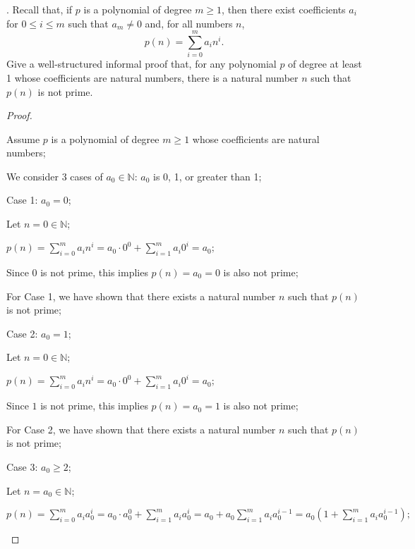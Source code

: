 \documentclass[11pt]{article}
\newcommand{\nats}{\mathbb{N}}
\begin{document}
.
Recall that, if $p$ is a polynomial of degree $m \geq 1$, then there exist coefficients $a_i$ for  $0 \leq i \leq m$ such that $a_m \neq 0$ and, for all numbers $n$,
$$p(n) =  \sum_{i=0}^m a_i n^i.$$
Give a well-structured informal proof that, for any polynomial $p$ of degree at least 1 whose coefficients are natural numbers,
there is a natural number $n$ such that $p(n)$ is not prime.




\begin{proof}
    \begin{adjustwidth}{1cm}{}
    \end{adjustwidth}

    \begin{adjustwidth}{0.5cm}{}
        Assume $p$ is a polynomial of degree $m\geq 1$ whose coefficients are natural numbers;

        We consider 3 cases of $a_0\in\nats$: $a_0$ is 0, 1, or greater than 1;

        Case 1: $a_0 = 0$;
        \begin{adjustwidth}{1.25cm}{}
            Let $n = 0\in\nats$;

            $\displaystyle p(n)=\sum_{i=0}^{m}a_i n^i=a_0\cdot 0^0+\sum_{i=1}^{m}a_i 0^i=a_0;$

            Since $0$ is not prime, this implies $p(n)=a_0=0$ is also not prime;
        \end{adjustwidth}
        For Case 1, we have shown that there exists a natural number $n$ such that $p(n)$ is not prime;

        Case 2: $a_0 = 1$;
        \begin{adjustwidth}{1.25cm}{}
            Let $n = 0\in\nats$;

            $\displaystyle p(n)=\sum_{i=0}^{m}a_i n^i=a_0\cdot 0^0+\sum_{i=1}^{m}a_i 0^i=a_0;$

            Since $1$ is not prime, this implies $p(n)=a_0=1$ is also not prime;
        \end{adjustwidth}
        For Case 2, we have shown that there exists a natural number $n$ such that $p(n)$ is not prime;

        Case 3: $a_0 \geq 2$;
        \begin{adjustwidth}{1.25cm}{}
            Let $n = a_0\in \nats$;

            $\displaystyle
                p(n)=\sum_{i=0}^m a_i a_0^i =a_0\cdot a_0^0 + \sum_{i=1}^m a_i a_0^i=a_0 + a_0\sum_{i=1}^m a_i a_0^{i-1} = a_0\left(1+\sum_{i=1}^m a_i a_0^{i-1}\right);
            $


\end{adjustwidth}
\end{adjustwidth}
\end{proof}
\end{document}
